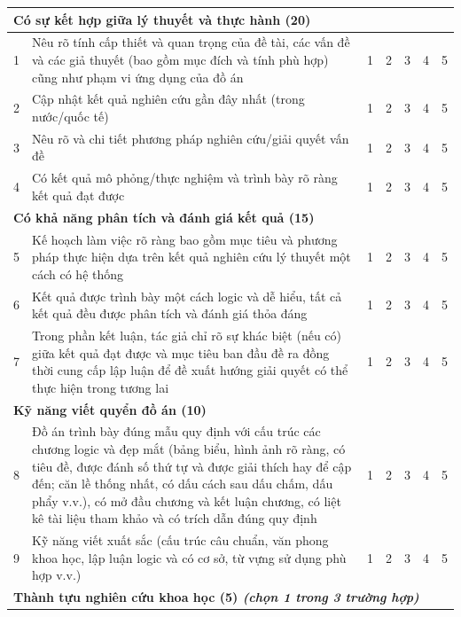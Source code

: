 \vspace{5pt}
\begin{center}
\fontsize{9pt}{11pt}\selectfont
\renewcommand{\arraystretch}{1.2}
\begin{tabularx}{\textwidth}{|c|X|c|c|c|c|c|}
\hline
\multicolumn{7}{|l|}{\textbf{Có sự kết hợp giữa lý thuyết và thực hành (20)}} \\ \hline
1 & Nêu rõ tính cấp thiết và quan trọng của đề tài, các vấn đề và các giả thuyết (bao gồm mục đích và tính phù hợp) cũng như phạm vi ứng dụng của đồ án & 1 & 2 & 3 & 4 & 5 \\ \hline
2 & Cập nhật kết quả nghiên cứu gần đây nhất (trong nước/quốc tế) & 1 & 2 & 3 & 4 & 5 \\ \hline
3 & Nêu rõ và chi tiết phương pháp nghiên cứu/giải quyết vấn đề & 1 & 2 & 3 & 4 & 5 \\ \hline
4 & Có kết quả mô phỏng/thực nghiệm và trình bày rõ ràng kết quả đạt được & 1 & 2 & 3 & 4 & 5 \\ \hline
\multicolumn{7}{|l|}{\textbf{Có khả năng phân tích và đánh giá kết quả (15)}} \\ \hline
5 & Kế hoạch làm việc rõ ràng bao gồm mục tiêu và phương pháp thực hiện dựa trên kết quả nghiên cứu lý thuyết một cách có hệ thống & 1 & 2 & 3 & 4 & 5 \\ \hline
6 & Kết quả được trình bày một cách logic và dễ hiểu, tất cả kết quả đều được phân tích và đánh giá thỏa đáng & 1 & 2 & 3 & 4 & 5 \\ \hline
7 & Trong phần kết luận, tác giả chỉ rõ sự khác biệt (nếu có) giữa kết quả đạt được và mục tiêu ban đầu đề ra đồng thời cung cấp lập luận để đề xuất hướng giải quyết có thể thực hiện trong tương lai & 1 & 2 & 3 & 4 & 5 \\ \hline
\multicolumn{7}{|l|}{\textbf{Kỹ năng viết quyển đồ án (10)}} \\ \hline
8 & Đồ án trình bày đúng mẫu quy định với cấu trúc các chương logic và đẹp mắt (bảng biểu, hình ảnh rõ ràng, có tiêu đề, được đánh số thứ tự và được giải thích hay để cập đến; căn lề thống nhất, có dấu cách sau dấu chấm, dấu phẩy v.v.), có mở đầu chương và kết luận chương, có liệt kê tài liệu tham khảo và có trích dẫn đúng quy định & 1 & 2 & 3 & 4 & 5 \\ \hline
9 & Kỹ năng viết xuất sắc (cấu trúc câu chuẩn, văn phong khoa học, lập luận logic và có cơ sở, từ vựng sử dụng phù hợp v.v.) & 1 & 2 & 3 & 4 & 5 \\ \hline
\multicolumn{7}{|l|}{\textbf{Thành tựu nghiên cứu khoa học (5) \textit{(chọn 1 trong 3 trường hợp)}}} \\ \hline

\end{tabularx}
\end{center}

